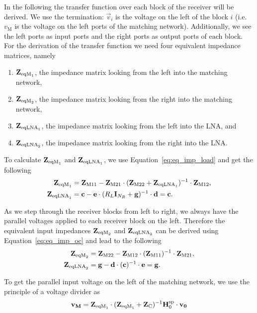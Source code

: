 In the following the transfer function over each block of the receiver will be derived.
We use the termination: $\vec{v}_i$ is the voltage on the left of the block $i$ (i.e. $v_\text{M}$ is the voltage on the left ports of the matching network).
Additionally, we see the left ports as input ports and the right ports as output ports of each block.
For the derivation of the transfer function we need four equivalent impedance matrices, namely
\begin{enumerate}
\item{$\mathbf{Z}_{\text{eqM}_1}$, the impedance matrix looking from the left into the matching network,}
\item{$\mathbf{Z}_{\text{eqM}_2}$, the impedance matrix looking from the right into the matching network,}
\item{$\mathbf{Z}_{\text{eqLNA}_1}$, the impedance matrix looking from the left into the LNA, and}
\item{$\mathbf{Z}_{\text{eqLNA}_2}$, the impedance matrix looking from the right into the LNA.}
\end{enumerate}

To calculate $\mathbf{Z}_{\text{eqM}_1}$ and $\mathbf{Z}_{\text{eqLNA}_1}$, we use Equation~\eqref{eq:eq_imp_load} and get the following
\begin{align}
\label{eq:zeqm1}
\mathbf{Z}_{\text{eqM}_1} &= \mathbf{Z}_\text{M11} - \mathbf{Z}_\text{M21}\cdot(\mathbf{Z}_\text{M22} + \mathbf{Z}_{\text{eqLNA}_1})^{-1}\cdot\mathbf{Z}_\text{M12},\\
\label{eq:zeqlna1}
\mathbf{Z}_{\text{eqLNA}_1} &= \mathbf{c} - \mathbf{e}\cdot(R_L\mathbf{I}_{N_R} + \mathbf{g})^{-1}\cdot\mathbf{d} = \mathbf{c}.
\end{align}

As we step through the receiver blocks from left to right, we always have the parallel voltages applied to each receiver block on the left.
Therefore the equivalent input impedances $\mathbf{Z}_{\text{eqM}_2}$ and $\mathbf{Z}_{\text{eqLNA}_2}$ can be derived using Equation~\eqref{eq:eq_imp_oc} and lead to the following
\begin{align}
\label{eq:zeqm2}
\mathbf{Z}_{\text{eqM}_2} &= \mathbf{Z}_\text{M22} - \mathbf{Z}_\text{M12}\cdot(\mathbf{Z}_\text{M11})^{-1}\cdot\mathbf{Z}_\text{M21},\\
\label{eq:zeqlna2}
\mathbf{Z}_{\text{eqLNA}_2} &= \mathbf{g} - \mathbf{d}\cdot(\mathbf{c})^{-1}\cdot\mathbf{e} = \mathbf{g}.
\end{align}

To get the parallel input voltage on the left of the matching network, we use the principle of a voltage divider as
\begin{equation}
\mathbf{v_M} = \mathbf{Z}_{\text{eqM}_1}\cdot(\mathbf{Z}_{\text{eqM}_1} + \mathbf{Z}_\text{C})^{-1} \mathbf{H}_{0}^{\text{sp}}\cdot \mathbf{v_0}
\end{equation}

